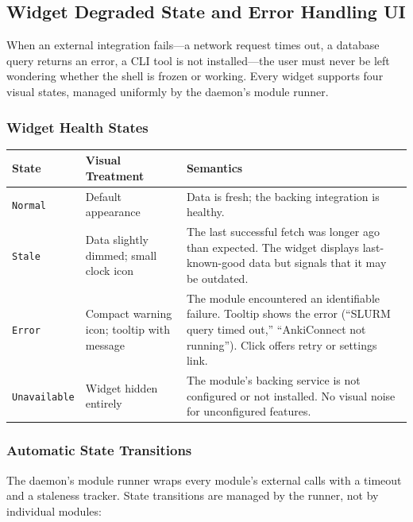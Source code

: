 \documentclass[11pt,a4paper]{article}
\begin{document}
\subsection{Widget Degraded State and Error Handling UI}
\label{sec:degraded-state}

When an external integration fails---a network request times out, a database query returns an error, a CLI tool is not installed---the user must never be left wondering whether the shell is frozen or working. Every widget supports four visual states, managed uniformly by the daemon's module runner.

\subsubsection{Widget Health States}

\begin{longtable}{p{2.5cm} p{3.5cm} p{7.5cm}}
\toprule
\textbf{State} & \textbf{Visual Treatment} & \textbf{Semantics} \\
\midrule
\texttt{Normal} & Default appearance & Data is fresh; the backing integration is healthy. \\
\texttt{Stale} & Data slightly dimmed; small clock icon & The last successful fetch was longer ago than expected. The widget displays last-known-good data but signals that it may be outdated. \\
\texttt{Error} & Compact warning icon; tooltip with message & The module encountered an identifiable failure. Tooltip shows the error (``SLURM query timed out,'' ``AnkiConnect not running''). Click offers retry or settings link. \\
\texttt{Unavailable} & Widget hidden entirely & The module's backing service is not configured or not installed. No visual noise for unconfigured features. \\
\bottomrule
\end{longtable}

\subsubsection{Automatic State Transitions}

The daemon's module runner wraps every module's external calls with a timeout and a staleness tracker. State transitions are managed by the runner, not by individual modules:
\end{document}
